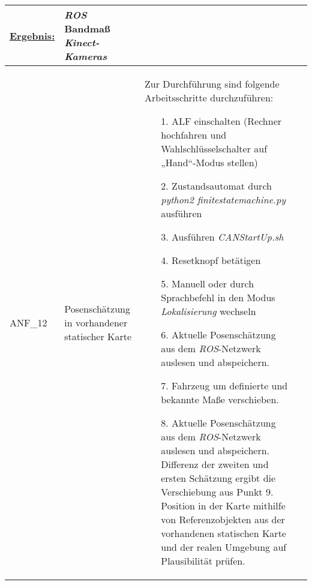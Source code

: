 \documentclass[12pt,a4paper,oneside,numbers=noenddot,captions=tableheading,toc=bibliography,openany,tikz,margin=5mm]{scrbook}
\begin{document}
\begin{longtable}{|p{}|p{}|p{7cm}|p{}|}
	\underline{Ergebnis:}\newline
	\newline
	\textbf{}%
	& \textit{ROS}\newline
	Bandmaß\newline
	\textit{Kinect-Kameras}
	\\
	\hline
	ANF\_12&Posenschätzung in vorhandener statischer Karte & Zur Durchführung sind folgende Arbeitsschritte durchzuführen:
	\begin{itemize}
		\item[1.]	ALF einschalten (Rechner hochfahren und Wahlschlüsselschalter auf „Hand“-Modus stellen)
		\item[2.]	Zustandsautomat durch \textit{python2 finitestatemachine.py} ausführen
		\item[3.]	Ausführen \textit{CANStartUp.sh}
		\item[4.]	Resetknopf betätigen
		\item[5.]	Manuell oder durch Sprachbefehl in den Modus \textit{\textit{Lokalisierung}} wechseln
		\item[6.]	Aktuelle Posenschätzung aus dem \textit{ROS}-Netzwerk auslesen und abspeichern.
		\item[7.]	Fahrzeug um definierte und bekannte Maße verschieben.
		\item[8.]	Aktuelle Posenschätzung aus dem \textit{ROS}-Netzwerk auslesen und abspeichern. Differenz der zweiten und ersten Schätzung ergibt die Verschiebung aus Punkt 9. Position in der Karte mithilfe von Referenzobjekten aus der vorhandenen statischen Karte und der realen Umgebung auf Plausibilität prüfen.
	\end{itemize}
	

\end{longtable}
\end{document}
